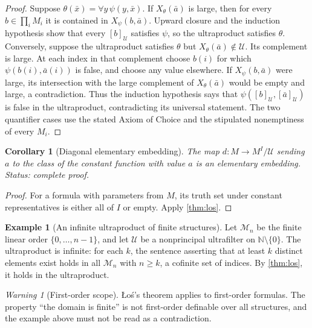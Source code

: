 \documentclass[11pt,oneside,openany]{book}
\theoremstyle{definition}
\newtheorem{example}[definition]{Example}
\theoremstyle{plain}
\newtheorem{corollary}[definition]{Corollary}
\theoremstyle{remark}
\newtheorem{warning}[definition]{Warning}
\newcommand{\N}{\mathbb{N}}
\begin{document}
\begin{proof}
Suppose \(\theta(\bar x)=\forall y\,\psi(y,\bar x)\).  If
\(X_\theta(\bar a)\) is large, then for every \(b\in\prod_iM_i\) it is
contained in \(X_\psi(b,\bar a)\).  Upward closure and the induction
hypothesis show that every \([b]_{\mathcal U}\) satisfies \(\psi\), so the
ultraproduct satisfies \(\theta\).  Conversely, suppose the ultraproduct
satisfies \(\theta\) but \(X_\theta(\bar a)\notin\mathcal U\).  Its complement
is large.  At each index in that complement choose \(b(i)\) for which
\(\psi(b(i),\bar a(i))\) is false, and choose any value elsewhere.  If
\(X_\psi(b,\bar a)\) were large, its intersection with the large complement
of \(X_\theta(\bar a)\) would be empty and large, a contradiction.  Thus the
induction hypothesis says that \(\psi([b]_{\mathcal U},[\bar a]_{\mathcal U})\)
is false in the ultraproduct, contradicting its universal statement.  The two
quantifier cases use the stated Axiom of Choice and the stipulated
nonemptiness of every \(M_i\).
\end{proof}

\begin{corollary}[Diagonal elementary embedding]
\label{cor:diagonal-ultrapower}
The map \(d:M\to M^I/\mathcal U\) sending \(a\) to the class of the constant
function with value \(a\) is an elementary embedding.
\textit{Status: complete proof.}
\end{corollary}

\begin{proof}
For a formula with parameters from \(M\), its truth set under constant
representatives is either all of \(I\) or empty.  Apply
\cref{thm:los}.
\end{proof}

\begin{example}[An infinite ultraproduct of finite structures]
Let \(\mathcal M_n\) be the finite linear order
\(\{0,\ldots,n-1\}\), and let \(\mathcal U\) be a nonprincipal ultrafilter on
\(\N\setminus\{0\}\).  The ultraproduct is infinite: for each \(k\), the
sentence asserting that at least \(k\) distinct elements exist holds in all
\(\mathcal M_n\) with \(n\geq k\), a cofinite set of indices.  By
\cref{thm:los}, it holds in the ultraproduct.
\end{example}

\begin{warning}[First-order scope]
\L o\'s's theorem applies to first-order formulas.  The property ``the domain
is finite'' is not first-order definable over all structures, and the example
above must not be read as a contradiction.
\end{warning}
\end{document}
